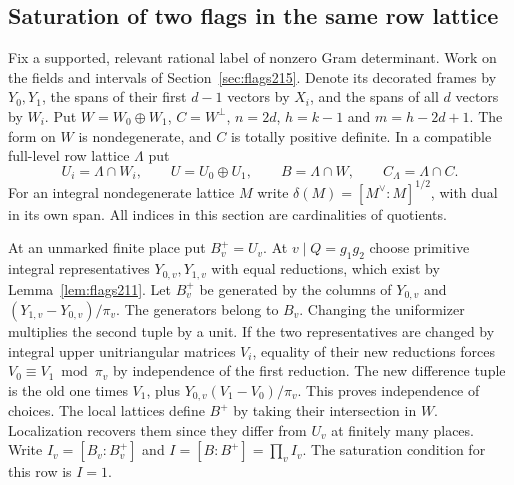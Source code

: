 \documentclass[a4paper,11pt]{article}
\theoremstyle{definition}
\theoremstyle{remark}
\numberwithin{equation}{section}
\begin{document}
\subsection{Saturation of two flags in the same row lattice}\label{nav:IX-10}
\label{sec:saturation219}

Fix a supported, relevant rational label of nonzero Gram
determinant. Work on the fields and intervals of
Section~\ref{sec:flags215}. Denote its decorated frames by
\(Y_0,Y_1\), the spans of their first \(d-1\) vectors by \(X_i\),
and the spans of all \(d\) vectors by \(W_i\). Put
\(W=W_0\oplus W_1\), \(C=W^\perp\), \(n=2d\), \(h=k-1\)
and \(m=h-2d+1\). The form on \(W\) is nondegenerate, and \(C\)
is totally positive definite. In a compatible full-level row
lattice \(\Lambda\) put
\[
 U_i=\Lambda\cap W_i,\qquad U=U_0\oplus U_1,\qquad
 B=\Lambda\cap W,\qquad C_\Lambda=\Lambda\cap C .
\]
For an integral nondegenerate lattice \(M\) write
\(\delta(M)=[M^\vee:M]^{1/2}\), with dual in its own span.
All indices in this section are cardinalities of quotients.

At an unmarked finite place put \(B_v^+=U_v\).
At \(v\mid Q=g_1g_2\) choose primitive integral representatives
\(Y_{0,v},Y_{1,v}\) with equal reductions, which exist by
Lemma~\ref{lem:flags211}. Let \(B_v^+\) be generated by the
columns of \(Y_{0,v}\) and \((Y_{1,v}-Y_{0,v})/\pi_v\).
The generators belong to \(B_v\). Changing the uniformizer
multiplies the second tuple by a unit. If the two representatives
are changed by integral upper unitriangular matrices \(V_i\),
equality of their new reductions forces \(V_0\equiv V_1\bmod\pi_v\)
by independence of the first reduction. The new difference tuple
is the old one times \(V_1\), plus \(Y_{0,v}(V_1-V_0)/\pi_v\).
This proves independence of choices. The local lattices define
\(B^+\) by taking their intersection in \(W\). Localization
recovers them since they differ from \(U_v\) at finitely many
places. Write \(I_v=[B_v:B_v^+]\) and \(I=[B:B^+]=\prod_v I_v\).
The saturation condition for this row is \(I=1\).
\end{document}
